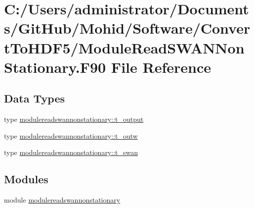 \hypertarget{_module_read_s_w_a_n_non_stationary_8_f90}{}\section{C\+:/\+Users/administrator/\+Documents/\+Git\+Hub/\+Mohid/\+Software/\+Convert\+To\+H\+D\+F5/\+Module\+Read\+S\+W\+A\+N\+Non\+Stationary.F90 File Reference}
\label{_module_read_s_w_a_n_non_stationary_8_f90}
\subsection*{Data Types}
\begin{DoxyCompactItemize}
\item 
type \mbox{\hyperlink{structmodulereadswannonstationary_1_1t__output}{modulereadswannonstationary\+::t\+\_\+output}}
\item 
type \mbox{\hyperlink{structmodulereadswannonstationary_1_1t__outw}{modulereadswannonstationary\+::t\+\_\+outw}}
\item 
type \mbox{\hyperlink{structmodulereadswannonstationary_1_1t__swan}{modulereadswannonstationary\+::t\+\_\+swan}}
\end{DoxyCompactItemize}
\subsection*{Modules}
\begin{DoxyCompactItemize}
\item 
module \mbox{\hyperlink{namespacemodulereadswannonstationary}{modulereadswannonstationary}}
\end{DoxyCompactItemize}
